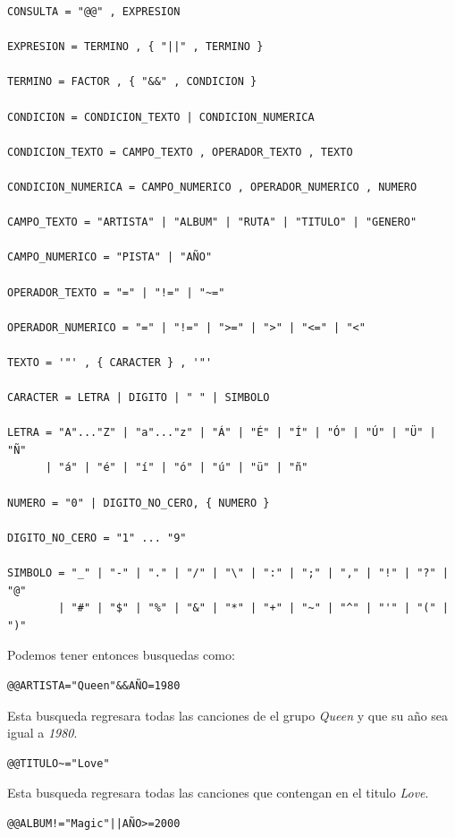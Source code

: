 \documentclass[12pt]{report}
\begin{document}
\begin{verbatim}
CONSULTA = "@@" , EXPRESION

EXPRESION = TERMINO , { "||" , TERMINO }

TERMINO = FACTOR , { "&&" , CONDICION }

CONDICION = CONDICION_TEXTO | CONDICION_NUMERICA

CONDICION_TEXTO = CAMPO_TEXTO , OPERADOR_TEXTO , TEXTO

CONDICION_NUMERICA = CAMPO_NUMERICO , OPERADOR_NUMERICO , NUMERO

CAMPO_TEXTO = "ARTISTA" | "ALBUM" | "RUTA" | "TITULO" | "GENERO"

CAMPO_NUMERICO = "PISTA" | "AÑO"

OPERADOR_TEXTO = "=" | "!=" | "~="

OPERADOR_NUMERICO = "=" | "!=" | ">=" | ">" | "<=" | "<"

TEXTO = '"' , { CARACTER } , '"'

CARACTER = LETRA | DIGITO | " " | SIMBOLO 

LETRA = "A"..."Z" | "a"..."z" | "Á" | "É" | "Í" | "Ó" | "Ú" | "Ü" | "Ñ"
      | "á" | "é" | "í" | "ó" | "ú" | "ü" | "ñ"

NUMERO = "0" | DIGITO_NO_CERO, { NUMERO }

DIGITO_NO_CERO = "1" ... "9"

SIMBOLO = "_" | "-" | "." | "/" | "\" | ":" | ";" | "," | "!" | "?" | "@"
        | "#" | "$" | "%" | "&" | "*" | "+" | "~" | "^" | "'" | "(" | ")"

\end{verbatim}

Podemos tener entonces busquedas como:\\

\begin{verbatim}        
@@ARTISTA="Queen"&&AÑO=1980
\end{verbatim}

Esta busqueda regresara todas las canciones de el grupo \textit{Queen} y que su año sea igual a \textit{1980}.\\

\begin{verbatim}        
@@TITULO~="Love"
\end{verbatim}        

Esta busqueda regresara todas las canciones que contengan en el titulo \textit{Love}.\\

\begin{verbatim}        
@@ALBUM!="Magic"||AÑO>=2000
\end{verbatim}
\end{document}
